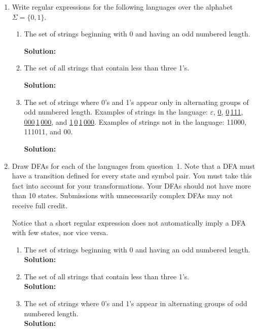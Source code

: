 \documentclass[11pt]{article}
\renewcommand{\epsilon}{\varepsilon}
\begin{document}
\begin{enumerate}
\item Write regular expressions for the following languages over the alphabet $\Sigma = \{0, 1\}$.
\begin{enumerate}
    \item The set of strings beginning with 0 and having an odd numbered length.

    \textbf{Solution:}

    \item The set of all strings that contain less than three 1's.

    \textbf{Solution:} 

    \item The set of strings where 0's and 1's appear only in alternating groups of odd numbered length. Examples of strings in the language: $\epsilon$, \underline{0},  \underline{0}\,\underline{111}, \underline{000}\,\underline{1}\,\underline{000}, and \underline{1}\,\underline{0}\,\underline{1}\,\underline{000}. Examples of strings not in the language: 11000, 111011, and 00.

    \textbf{Solution:} 
    
\end{enumerate}

\newpage

\item Draw DFAs for each of the languages from question~1. Note that a DFA must have a transition defined for every state and symbol pair. You must take this fact into account for your transformations. Your DFAs should not have more than 10 states. Submissions with unnecessarily complex DFAs may not receive full credit.

Notice that a short regular expression does not automatically imply a DFA with few states, nor vice versa.

\begin{enumerate}
    \item The set of strings beginning with 0 and having an odd numbered length.\\
    \textbf{Solution:}

    \item The set of all strings that contain less than three 1's.\\
    \textbf{Solution:}

    \item The set of strings where 0's and 1's appear in alternating groups of odd numbered length.\\
    \textbf{Solution:}
    

\end{enumerate}
\end{enumerate}
\end{document}
